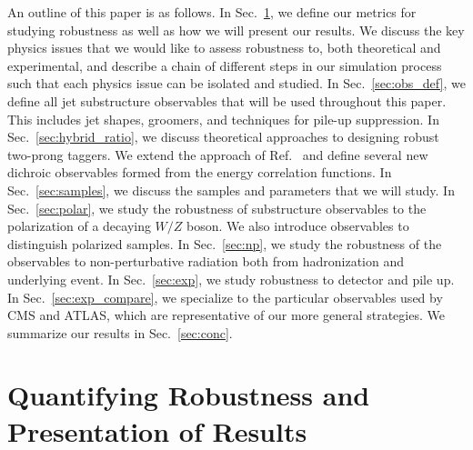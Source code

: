 \documentclass[11pt,letterpaper]{article}
\DeclareRobustCommand{\Sec}[1]{Sec.~\ref{#1}}
\DeclareRobustCommand{\Ref}[1]{Ref.~\cite{#1}}
\begin{document}
%





%
%
%
%
%
%
%


An outline of this paper is as follows.
%
In \Sec{sec:pres}, we define our metrics for studying robustness as well as how we will present our results.
%
We discuss the key physics issues that we would like to assess robustness to, both theoretical and experimental, and describe a chain of different steps in our simulation process such that each physics issue can be isolated and studied.
%
In \Sec{sec:obs_def}, we define all jet substructure observables that will be used throughout this paper.
%
This includes jet shapes, groomers, and techniques for pile-up suppression.
%
In \Sec{sec:hybrid_ratio}, we discuss theoretical approaches to designing robust two-prong taggers.
%
We extend the approach of \Ref{Salam:2016yht} and define several new dichroic observables formed from the energy correlation functions.  
%
In \Sec{sec:samples}, we discuss the samples and parameters that we will study.
%
In \Sec{sec:polar}, we study the robustness of substructure observables to the polarization of a decaying $W/Z$ boson.
%
We also introduce observables to distinguish polarized samples.
%
In \Sec{sec:np}, we study the robustness of the observables to non-perturbative radiation both from hadronization and underlying event.
%
In \Sec{sec:exp}, we study robustness to detector and pile up.
%
In \Sec{sec:exp_compare}, we specialize to the particular observables used by CMS and ATLAS, which are representative of our more general strategies.
%
We summarize our results in \Sec{sec:conc}.

\section{Quantifying Robustness and Presentation of Results}\label{sec:pres}
\end{document}
